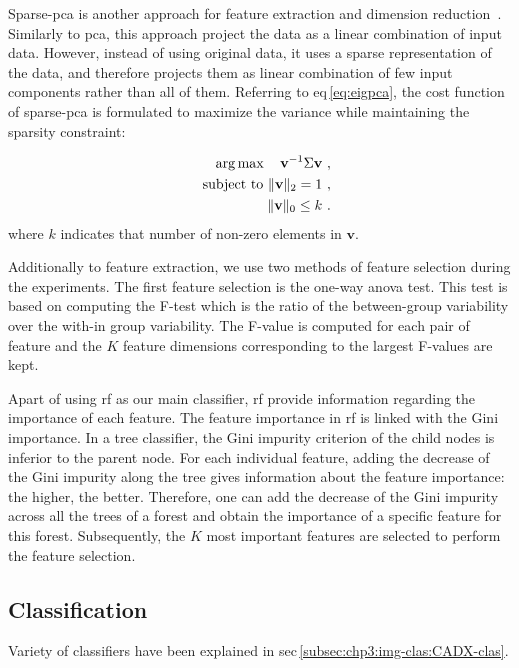 Sparse-\ac{pca} is another approach for feature extraction and dimension reduction~\cite{zou2006sparse}.
Similarly to \ac{pca}, this approach project the data as a linear combination of input data.
However, instead of using original data, it uses a sparse representation of the data, and therefore projects them as linear combination of few input components rather than all of them.
Referring to \acs{eq}\,\eqref{eq:eigpca}, the cost function of sparse-\ac{pca} is formulated to maximize the variance while maintaining the sparsity constraint:

\begin{eqnarray}
 && \operatorname*{arg\,max} \quad   \mathbf{v}^{-1} \Sigma \mathbf{v}\ , \label{eq:sparsepca}\\ 
 && \text{subject to }  \Vert \mathbf{v} \Vert_{2} = 1\ , \nonumber \\
 && \Vert \mathbf{v} \Vert_{0} \leq k\ . \nonumber
\end{eqnarray}
\noindent where $k$ indicates that number of non-zero elements in $\mathbf{v}$.

Additionally to feature extraction, we use two methods of feature selection during the experiments.
The first feature selection is the one-way \ac{anova} test.
This test is based on computing the F-test which is the ratio of the between-group variability over the with-in group variability.
The F-value is computed for each pair of feature and the $K$ feature dimensions corresponding to the largest F-values are kept.

Apart of using \ac{rf} as our main classifier, \ac{rf} provide information regarding the importance of each feature.
The feature importance in \ac{rf} is linked with the Gini importance.
In a tree classifier, the Gini impurity criterion of the child nodes is inferior to the parent node.
For each individual feature, adding the decrease of the Gini impurity along the tree gives information about the feature importance: the higher, the better.
Therefore, one can add the decrease of the Gini impurity across all the trees of a forest and obtain the importance of a specific feature for this forest.
Subsequently, the $K$ most important features are selected to perform the feature selection.

\subsection{Classification}\label{subsec:chp6:method:clas}
Variety of classifiers have been explained in \acs{sec}\,\ref{subsec:chp3:img-clas:CADX-clas}. 

